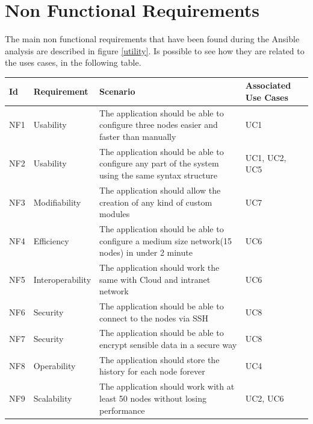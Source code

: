 \documentclass[conference]{IEEEtran}
\begin{document}
\section{Non Functional Requirements}
The main non functional requirements that have been found during the Ansible analysis are described in figure \ref{utility}. Is possible to see how they are related to the uses cases, in the following table.
\begin{table}[htbp]
\begin{center}
\begin{tabular}{|p{1cm}|p{1.5cm}|p{3cm}|p{1.2cm}|}
\hline
\textbf{Id} &  \textbf{Requirement} & \textbf{Scenario} & \textbf{Associated Use Cases} \\
\hline
\hline
NF1 & Usability & The application should be able to configure three nodes easier and faster than manually & UC1 \\
\hline
NF2 & Usability & The application should be able to configure any part of the system using the same syntax structure & UC1, UC2, UC5 \\
\hline
NF3 & Modifiability & The application should allow the creation of any kind of custom modules & UC7 \\
\hline
NF4 & Efficiency & The application should be able to configure a medium size network(15 nodes) in under 2 minute & UC6 \\
\hline
NF5 & Interoperability & The application should work the same with Cloud and intranet network & UC6 \\
\hline
NF6 & Security & The application should be able to connect to the nodes via SSH & UC8 \\
\hline
NF7 & Security & The application should be able to encrypt sensible data in a secure way & UC8 \\
\hline
NF8 & Operability & The application should store the history for each node forever & UC4\\
\hline
NF9 & Scalability & The application should work with at least 50 nodes without losing performance & UC2, UC6 \\
\hline
\end{tabular}
\label{tab2}
\end{center}
\end{table} 
\end{document}
